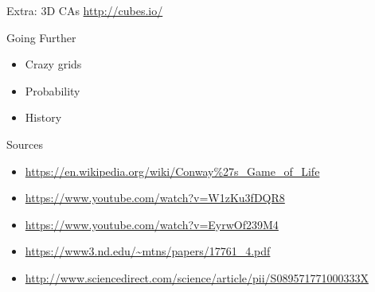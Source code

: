 \documentclass[bigger]{beamer}
\begin{document}
\begin{frame}[label=sec-25]{Extra: 3D CAs}
\url{http://cubes.io/}
\end{frame}
\begin{frame}[label=sec-26]{Going Further}
\begin{itemize}
\item<1->Crazy grids
\item<2->Probability
\item<3->History
\end{itemize}
\end{frame}
\begin{frame}[label=sec-27]{Sources}
\begin{itemize}
\item \url{https://en.wikipedia.org/wiki/Conway\%27s_Game_of_Life}
\item \url{https://www.youtube.com/watch?v=W1zKu3fDQR8}
\item \url{https://www.youtube.com/watch?v=EyrwOf239M4}
\item \url{https://www3.nd.edu/~mtns/papers/17761_4.pdf}
\item \url{http://www.sciencedirect.com/science/article/pii/S089571771000333X}
\end{itemize}
\end{frame}
\end{document}
